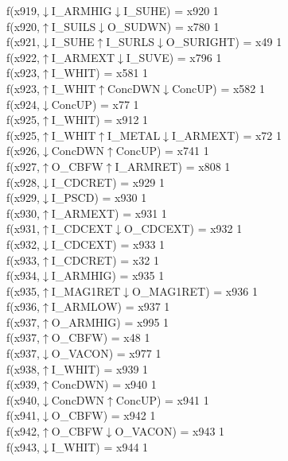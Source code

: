 f(x919,$\downarrow$I\_ARMHIG$\downarrow$I\_SUHE) = x920 {1} \\
f(x920,$\uparrow$I\_SUILS$\downarrow$O\_SUDWN) = x780 {1} \\
f(x921,$\downarrow$I\_SUHE$\uparrow$I\_SURLS$\downarrow$O\_SURIGHT) = x49 {1} \\
f(x922,$\uparrow$I\_ARMEXT$\downarrow$I\_SUVE) = x796 {1} \\
f(x923,$\uparrow$I\_WHIT) = x581 {1} \\
f(x923,$\uparrow$I\_WHIT$\uparrow$ConcDWN$\downarrow$ConcUP) = x582 {1} \\
f(x924,$\downarrow$ConcUP) = x77 {1} \\
f(x925,$\uparrow$I\_WHIT) = x912 {1} \\
f(x925,$\uparrow$I\_WHIT$\uparrow$I\_METAL$\downarrow$I\_ARMEXT) = x72 {1} \\
f(x926,$\downarrow$ConcDWN$\uparrow$ConcUP) = x741 {1} \\
f(x927,$\uparrow$O\_CBFW$\uparrow$I\_ARMRET) = x808 {1} \\
f(x928,$\downarrow$I\_CDCRET) = x929 {1} \\
f(x929,$\downarrow$I\_PSCD) = x930 {1} \\
f(x930,$\uparrow$I\_ARMEXT) = x931 {1} \\
f(x931,$\uparrow$I\_CDCEXT$\downarrow$O\_CDCEXT) = x932 {1} \\
f(x932,$\downarrow$I\_CDCEXT) = x933 {1} \\
f(x933,$\uparrow$I\_CDCRET) = x32 {1} \\
f(x934,$\downarrow$I\_ARMHIG) = x935 {1} \\
f(x935,$\uparrow$I\_MAG1RET$\downarrow$O\_MAG1RET) = x936 {1} \\
f(x936,$\uparrow$I\_ARMLOW) = x937 {1} \\
f(x937,$\uparrow$O\_ARMHIG) = x995 {1} \\
f(x937,$\uparrow$O\_CBFW) = x48 {1} \\
f(x937,$\downarrow$O\_VACON) = x977 {1} \\
f(x938,$\uparrow$I\_WHIT) = x939 {1} \\
f(x939,$\uparrow$ConcDWN) = x940 {1} \\
f(x940,$\downarrow$ConcDWN$\uparrow$ConcUP) = x941 {1} \\
f(x941,$\downarrow$O\_CBFW) = x942 {1} \\
f(x942,$\uparrow$O\_CBFW$\downarrow$O\_VACON) = x943 {1} \\
f(x943,$\downarrow$I\_WHIT) = x944 {1} \\
